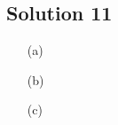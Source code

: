 \subsection*{Solution 11}

\begin{itemize}
\item[(a)]
\todo
\item[(b)]
\todo
\item[(c)]
\todo
\end{itemize}

